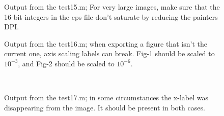 \documentclass[a4paper,11pt]{article}
\begin{document}
     \begin{figure}[ht]
       \centering
       \caption{Output from the {\ttfamily test15.m}; For very large images, make sure that the
         16-bit integers in the eps file don't saturate by reducing the painters DPI.}
     \end{figure}
     \begin{figure}[ht]
       \centering
       \quad
       \caption{Output from the {\ttfamily test16.m}; when exporting a figure that isn't the
         current one, axis scaling labels can break. Fig-1 should be scaled to $10^{-3}$, and
         Fig-2 should be scaled to $10^{-6}$.}
     \end{figure}
     \begin{figure}[ht]
       \centering
       \\
       \caption{Output from the {\ttfamily test17.m}; in some circumstances the x-label was
         disappearing from the image. It should be present in both cases.}
     \end{figure}
\end{document}
